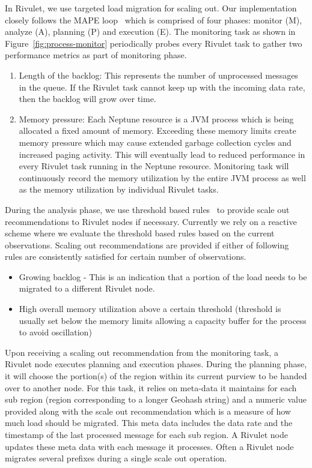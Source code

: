 In Rivulet, we use targeted load migration for scaling out.
Our implementation closely follows the MAPE loop~\cite{maurer2011revealing} which is comprised of four phases: monitor (M), analyze (A), planning (P) and execution (E).
The monitoring task as shown in Figure~\ref{fig:process-monitor} periodically probes every Rivulet task to gather two performance metrics as part of monitoring phase.
\begin{enumerate}[leftmargin=*]
	\item Length of the backlog: This represents the number of unprocessed messages in the queue. If the Rivulet task cannot keep up with the incoming data rate, then the backlog will grow over time.
	\item Memory pressure: Each Neptune resource is a JVM process which is being allocated a fixed amount of memory. 
	Exceeding these memory limits create memory pressure which may cause extended garbage collection cycles and increased paging activity. 
	This will eventually lead to reduced performance in every Rivulet task running in the Neptune resource.
	Monitoring task will continuously record the memory utilization by the entire JVM process as well as the memory utilization by individual Rivulet tasks.
\end{enumerate} 

During the analysis phase, we use threshold based rules~\cite{lorido2012auto} to provide scale out recommendations to Rivulet nodes if necessary.
Currently we rely on a reactive scheme where we evaluate the threshold based rules based on the current observations.
Scaling out recommendations are provided if either of following rules are consistently satisfied for certain number of observations.
\begin{itemize}[leftmargin=*]  
\item Growing backlog - This is an indication that a portion of the load needs to be migrated to a different Rivulet node.
\item High overall memory utilization above a certain threshold (threshold is usually set below the memory limits allowing a capacity buffer for the process to avoid oscillation)
\end{itemize}

Upon receiving a scaling out recommendation from the monitoring task, a Rivulet node executes planning and execution phases.
During the planning phase, it will choose the portion(s) of the region within its current purview to be handed over to another node.
For this task, it relies on meta-data it maintains for each sub region (region corresponding to a longer Geohash string) and a numeric value provided along with the scale out recommendation which is a measure of how much load should be migrated.
This meta data includes the data rate and the timestamp of the last processed message for each sub region.
A Rivulet node updates these meta data with each message it processes.
Often a Rivulet node migrates several prefixes during a single scale out operation.

